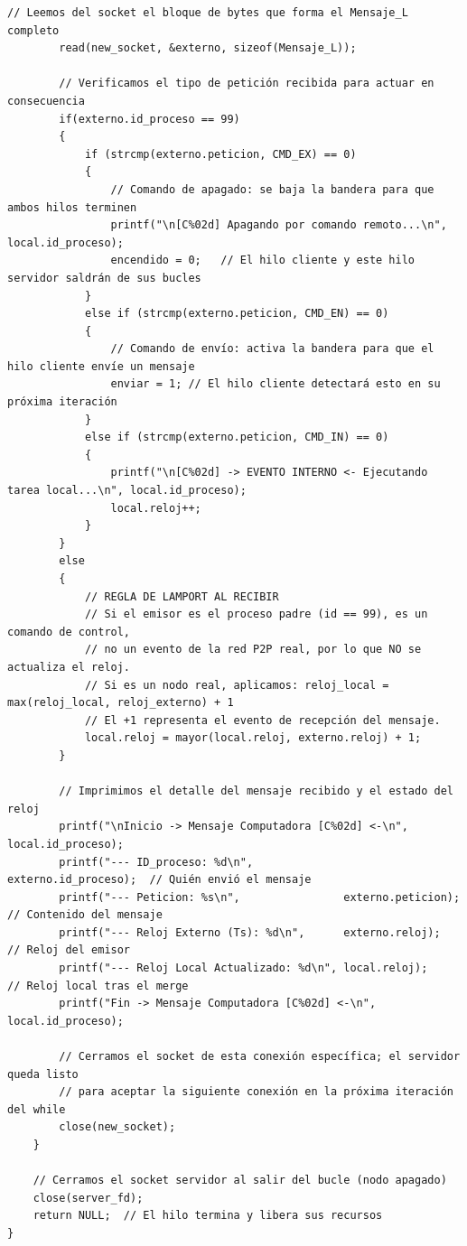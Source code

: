 \begin{lstlisting}[style=estiloC]
        // Leemos del socket el bloque de bytes que forma el Mensaje_L completo
        read(new_socket, &externo, sizeof(Mensaje_L));

        // Verificamos el tipo de petición recibida para actuar en consecuencia
        if(externo.id_proceso == 99)
        {
            if (strcmp(externo.peticion, CMD_EX) == 0)
            {
                // Comando de apagado: se baja la bandera para que ambos hilos terminen
                printf("\n[C%02d] Apagando por comando remoto...\n", local.id_proceso);
                encendido = 0;   // El hilo cliente y este hilo servidor saldrán de sus bucles
            }
            else if (strcmp(externo.peticion, CMD_EN) == 0)
            {
                // Comando de envío: activa la bandera para que el hilo cliente envíe un mensaje
                enviar = 1; // El hilo cliente detectará esto en su próxima iteración
            }
            else if (strcmp(externo.peticion, CMD_IN) == 0)
            {
                printf("\n[C%02d] -> EVENTO INTERNO <- Ejecutando tarea local...\n", local.id_proceso);
                local.reloj++;
            }
        }
        else
        {
            // REGLA DE LAMPORT AL RECIBIR 
            // Si el emisor es el proceso padre (id == 99), es un comando de control,
            // no un evento de la red P2P real, por lo que NO se actualiza el reloj.
            // Si es un nodo real, aplicamos: reloj_local = max(reloj_local, reloj_externo) + 1
            // El +1 representa el evento de recepción del mensaje.
            local.reloj = mayor(local.reloj, externo.reloj) + 1;           
        }

        // Imprimimos el detalle del mensaje recibido y el estado del reloj
        printf("\nInicio -> Mensaje Computadora [C%02d] <-\n", local.id_proceso);
        printf("--- ID_proceso: %d\n",              externo.id_proceso);  // Quién envió el mensaje
        printf("--- Peticion: %s\n",                externo.peticion);    // Contenido del mensaje
        printf("--- Reloj Externo (Ts): %d\n",      externo.reloj);       // Reloj del emisor
        printf("--- Reloj Local Actualizado: %d\n", local.reloj);         // Reloj local tras el merge
        printf("Fin -> Mensaje Computadora [C%02d] <-\n", local.id_proceso);

        // Cerramos el socket de esta conexión específica; el servidor queda listo
        // para aceptar la siguiente conexión en la próxima iteración del while
        close(new_socket);
    }

    // Cerramos el socket servidor al salir del bucle (nodo apagado)
    close(server_fd);
    return NULL;  // El hilo termina y libera sus recursos
}


\end{lstlisting}
